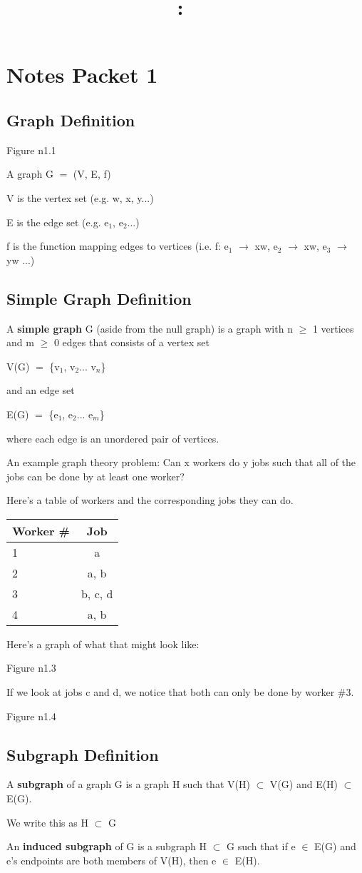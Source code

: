 \documentclass{article}
\title{
    \vspace{2in}
    \textmd{\textbf{\hmwkClass:\ \hmwkTitle}}\\
    \normalsize\vspace{0.1in}\small\vspace{0.1in}\large{\textit{\hmwkClassInstructor}}
    \vspace{3in}
}
\author{\hmwkAuthorName}
\date{}
\newcommand{\mt}[1]{\ensuremath{#1}}
\newcommand\bsc[2][\DefaultOpt]{%
  \def\DefaultOpt{#2}%
  \section[#1]{#2}%
}
\newcommand\ssc[2][\DefaultOpt]{%
  \def\DefaultOpt{#2}%
  \subsection[#1]{#2}%
}
\newcommand{\mem}{\mt{\in} }
\newcommand{\sbs}{\mt{\subset} }         %
\newcommand{\lra}{ \mt{\longrightarrow} } %
\newcommand{\bk}[1]{\{#1\}}
\newcommand{\gre}{\mt{\operatorname{\geq}} }
\newcommand{\eql}{ \mt{\operatorname{=}} }
\newcommand{\uw}[2]{#1\mt{_{#2}}}
\begin{document}
\bsc{Notes Packet 1}{

\ssc{Graph Definition} {
Figure n1.1

A graph G \eql (V, E, f)

V is the vertex set (e.g. w, x, y...)

E is the edge set (e.g. \uw{e}{1}, \uw{e}{2}...)

f is the function mapping edges to vertices (i.e. f: \uw{e}{1} \lra xw, \uw{e}{2} \lra xw, \uw{e}{3} \lra yw ...)
}
\ssc{Simple Graph Definition}{
A \textbf{simple graph} G (aside from the null graph) is a graph with n \gre 1 vertices and m \gre 0 edges that consists of a vertex set

V(G) \eql \bk{\uw{v}{1}, \uw{v}{2}... \uw{v}{n}}

and an edge set

E(G) \eql \bk{\uw{e}{1}, \uw{e}{2}... \uw{e}{m}}

where each edge is an unordered pair of vertices.
}

An example graph theory problem: Can x workers do y jobs such that all of the jobs can be done by at least one worker?

Here's a table of workers and the corresponding jobs they can do.

\begin{tabular}{l|c}
  Worker \# & Job \\
  \hline
  1 & a\\
  2 & a, b\\
  3 & b, c, d\\
  4 & a, b
\end{tabular}

Here's a graph of what that might look like:

Figure n1.3

If we look at jobs c and d, we notice that both can only be done by worker \#3.

Figure n1.4

\ssc{Subgraph Definition}{

A \textbf{subgraph} of a graph G is a graph H such that V(H) \sbs V(G) and E(H) \sbs E(G).

We write this as H \sbs G

An \textbf{induced subgraph} of G is a subgraph H \sbs G such that if e \mem E(G) and e's endpoints are both members of V(H), then e \mem E(H).

}
}
\end{document}
